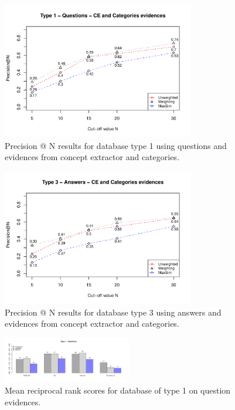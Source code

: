 \documentclass[conference]{IEEEtran}
\begin{document}
\begin{figure}[!t]
	\setlength{\belowcaptionskip}{-15pt}
	\setlength{\abovecaptionskip}{-5pt}
	\centering
	\includegraphics[width=3.3in]{type1questions_PAtN.pdf}
	\caption{Precision @ N results for database type 1 using questions and evidences from concept extractor and categories.}
	\label{fig:pntype1}
\end{figure}

\begin{figure}[!t]
	\setlength{\belowcaptionskip}{-15pt}
	\setlength{\abovecaptionskip}{-5pt}
	\centering
	\includegraphics[width=3.3in]{type3answers_PAtN.pdf}
	\caption{Precision @ N results for database type 3 using answers and evidences from concept extractor and categories.}
	\label{fig:pntype3}
\end{figure}


\begin{figure}[!t]
	\setlength{\belowcaptionskip}{-15pt}
	\setlength{\abovecaptionskip}{-10pt}
	\centering
	\includegraphics[width=0.5\textwidth]{mrrType1Questions.pdf}
	\caption{Mean reciprocal rank scores for database of type 1 on question evidences.}
	\label{fig:mrrtype1}
\end{figure}
\end{document}

